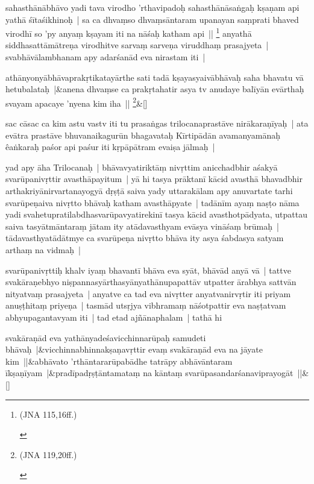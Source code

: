 \documentclass[article,12pt,a4paper]{memoir}
\newcommand{\persName}[1]{#1}
\begin{document}
	  \pstart sahasthānābhāvo yadi tava virodho 'rthavipadoḥ sahasthānāsaṅgaḥ kṣaṇam api yathā śītaśikhinoḥ | sa ca dhvaṃso dhvaṃsāntaram upanayan saṃprati bhaved virodhī so 'py anyaṃ kṣayam iti na nāśaḥ katham api || \footnote{\begin{english}(JNA 115,16ff.)\end{english}} \label{thakur75-121.11} anyathā siddhasattāmātreṇa virodhitve sarvaṃ sarveṇa viruddhaṃ prasajyeta | svabhāvālambhanam apy adarśanād eva nirastam iti |
	\pend
      
	    
	    \stanza[\smallbreak]
	athānyonyābhāvaprakṛtikatayārthe sati tadā kṣayasyaivābhāvaḥ saha bhavatu vā hetubalataḥ |&anena dhvaṃse ca prakṛtahatir asya tv anudaye balīyān evārthaḥ svayam apacaye 'nyena kim iha || \footnote{\begin{english}(JNA 119,20ff.)\end{english}}\&[\smallbreak]


	

	  \pstart sac cāsac ca kim astu vastv iti tu prasaṅgas \persName{trilocana}prastāve nirākaraṇīyaḥ | ata evātra prastāve bhuvanaikagurūn bhagavataḥ Kīrtipādān avamanyamānaḥ êaṅkaraḥ paśor api paśur iti kṛpāpātram evaiṣa jālmaḥ |
	\pend
      

	  \pstart yad apy āha \persName{Trilocanaḥ} | bhāvavyatiriktāṃ nivṛttim anicchadbhir aśakyā svarūpanivṛttir avasthāpayitum | yā hi tasya prāktanī kācid avasthā bhavadbhir arthakriyānirvartanayogyā dṛṣṭā saiva yady uttarakālam apy anuvartate tarhi svarūpeṇaiva nivṛtto bhāvaḥ katham avasthāpyate | tadānīm ayaṃ naṣṭo nāma yadi svahetupratilabdhasvarūpavyatirekinī tasya kācid avasthotpādyata, utpattau saiva tasyātmāntaraṃ jātam ity atādavasthyam evāsya vināśaṃ brūmaḥ | tādavasthyatādātmye ca svarūpeṇa nivṛtto bhāva ity asya śabdasya satyam arthaṃ na vidmaḥ |
	\pend
      

	  \pstart svarūpanivṛttiḥ khalv iyaṃ bhavantī bhāva eva syāt, bhāvād anyā vā | tattve svakāraṇebhyo niṣpannasyārthasyānyathānupapattāv utpatter ārabhya sattvān nityatvaṃ prasajyeta | anyatve ca tad eva nivṛtter anyatvanirvṛtir iti priyam anuṣṭhitaṃ priyeṇa | tasmād utsṛjya vibhramaṃ nāśotpattir eva naṣṭatvam abhyupagantavyam iti | \label{thakur75-122.1} tad etad ajñānaphalam | tathā hi
	\pend
      
	    
	    \stanza[\smallbreak]
	svakāraṇād eva yathānyadeśavicchinnarūpaḥ samudeti bhāvaḥ |&vicchinnabhinnakṣaṇavṛttir evaṃ svakāraṇād eva na jāyate kim ||&abhāvato 'rthāntararūpabādhe tatrāpy abhāvāntaram īkṣaṇīyam |&pradīpadṛṣṭāntamataṃ na kāntaṃ svarūpasandarśanaviprayogāt ||\&[\smallbreak]
\end{document}
